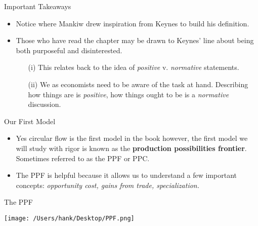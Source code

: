 \documentclass[aspectratio=169]{beamer}
\begin{document}
\begin{frame}{Important Takeaways}
 \begin{itemize}[label = $\bullet$, itemsep = 10pt]
    \item Notice where Mankiw drew inspiration from Keynes to build his definition.
    \item Those who have read the chapter may be drawn to Keynes' line about being both purposeful and disinterested.
    \begin{itemize}
        \item [(i)] This relates back to the idea of \textit{positive} v. \textit{normative} statements.
        \item [(ii)] We as economists need to be aware of the task at hand. Describing how things are is \textit{positive}, how things ought to be is a \textit{normative} discussion.
    \end{itemize}
 \end{itemize}
    
\end{frame}

\begin{frame}{Our First Model}
    \begin{itemize}[label = $\bullet$, itemsep = 10pt]
        \item Yes circular flow is the first model in the book however, the first model we will study with rigor is known as the
        \textbf{production possibilities frontier}. Sometimes referred to as the PPF or PPC.
        \item The PPF is helpful because it allows us to understand a few important concepts: \textit{opportunity cost, gains from trade, specialization.}
    \end{itemize}
\end{frame}

\begin{frame}{The PPF}

\begin{center}
    \texttt{[image: /Users/hank/Desktop/PPF.png]}
\end{center}
\end{frame}
\end{document}
